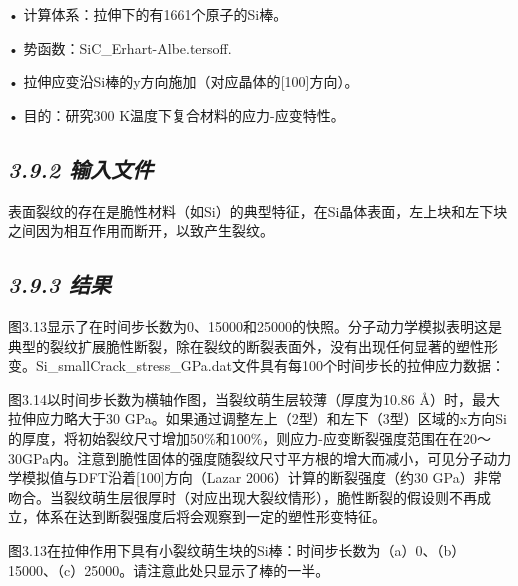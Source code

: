 • 计算体系：拉伸下的有1661个原子的Si棒。

• 势函数：SiC\_Erhart-Albe.tersoff.

• 拉伸应变沿Si棒的y方向施加（对应晶体的{[}100{]}方向）。

• 目的：研究300 K温度下复合材料的应力-应变特性。

\hypertarget{ux8f93ux5165ux6587ux4ef6-7}{%
\subsection{\texorpdfstring{\emph{3.9.2
输入文件}}{3.9.2 输入文件}}\label{ux8f93ux5165ux6587ux4ef6-7}}




表面裂纹的存在是脆性材料（如Si）的典型特征，在Si晶体表面，左上块和左下块之间因为相互作用而断开，以致产生裂纹。

\hypertarget{ux7ed3ux679c-8}{%
\subsection{\texorpdfstring{\emph{3.9.3
结果}}{3.9.3 结果}}\label{ux7ed3ux679c-8}}

图3.13显示了在时间步长数为0、15000和25000的快照。分子动力学模拟表明这是典型的裂纹扩展脆性断裂，除在裂纹的断裂表面外，没有出现任何显著的塑性形变。Si\_smallCrack\_stress\_GPa.dat文件具有每100个时间步长的拉伸应力数据：


图3.14以时间步长数为横轴作图，当裂纹萌生层较薄（厚度为10.86
Å）时，最大拉伸应力略大于30
GPa。如果通过调整左上（2型）和左下（3型）区域的x方向Si的厚度，将初始裂纹尺寸增加50\%和100\%，则应力-应变断裂强度范围在在20～30GPa内。注意到脆性固体的强度随裂纹尺寸平方根的增大而减小，可见分子动力学模拟值与DFT沿着{[}100{]}方向（Lazar
2006）计算的断裂强度（约30
GPa）非常吻合。当裂纹萌生层很厚时（对应出现大裂纹情形），脆性断裂的假设则不再成立，体系在达到断裂强度后将会观察到一定的塑性形变特征。


图3.13在拉伸作用下具有小裂纹萌生块的Si棒：时间步长数为（a）0、（b）15000、（c）25000。请注意此处只显示了棒的一半。

